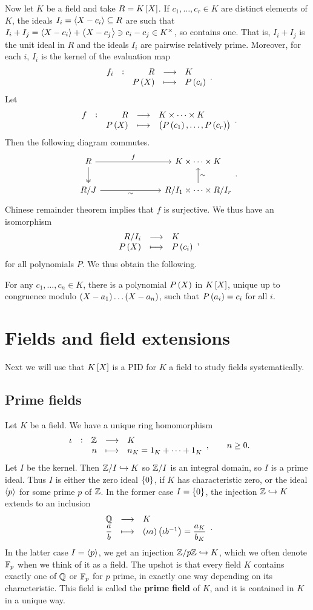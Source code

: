 Now let $ K $ be a field and take $ R = K\sbr{X} $. If $ c_1, \dots, c_r \in K $ are distinct elements of $ K $, the ideals $ I_i = \left\langle X - c_i \right\rangle \subseteq R $ are such that $ I_i + I_j = \left\langle X - c_i \right\rangle + \left\langle X - c_j \right\rangle \ni c_i - c_j \in K^\times $, so contains one. That is, $ I_i + I_j $ is the unit ideal in $ R $ and the ideals $ I_i $ are pairwise relatively prime. Moreover, for each $ i $, $ I_i $ is the kernel of the evaluation map
$$ \function[f_i]{R}{K}{P\br{X}}{P\br{c_i}}. $$
Let
$$ \function[f]{R}{K \times \dots \times K}{P\br{X}}{\br{P\br{c_1}, \dots, P\br{c_r}}}. $$
Then the following diagram commutes.
$$
\begin{tikzcd}[column sep=1in]
R \arrow{r}{f} \arrow[twoheadrightarrow]{d} & K \times \dots \times K \\
R / J \arrow[swap]{r}{\sim} & R / I_1 \times \dots \times R / I_r \arrow[swap]{u}{\sim}
\end{tikzcd}.
$$
Chinese remainder theorem implies that $ f $ is surjective. We thus have an isomorphism
$$ \function{R / I_i}{K}{P\br{X}}{P\br{c_i}}, $$
for all polynomials $ P $. We thus obtain the following.

\begin{theorem}
For any $ c_1, \dots, c_n \in K $, there is a polynomial $ P\br{X} $ in $ K\sbr{X} $, unique up to congruence modulo $ \br{X - a_1} \dots \br{X - a_n} $, such that $ P\br{a_i} = c_i $ for all $ i $.
\end{theorem}

\pagebreak

\section{Fields and field extensions}


Next we will use that $ K\sbr{X} $ is a PID for $ K $ a field to study fields systematically.

\subsection{Prime fields}

Let $ K $ be a field. We have a unique ring homomorphism
$$ \function[\iota]{\ZZ}{K}{n}{n_K = 1_K + \dots + 1_K}, \qquad n \ge 0. $$
Let $ I $ be the kernel. Then $ \mathbb{Z} / I \hookrightarrow K $ so $ \mathbb{Z} / I $ is an integral domain, so $ I $ is a prime ideal. Thus $ I $ is either the zero ideal $ \cbr{0} $, if $ K $ has characteristic zero, or the ideal $ \left\langle p \right\rangle $ for some prime $ p $ of $ \mathbb{Z} $. In the former case $ I = \cbr{0} $, the injection $ \mathbb{Z} \hookrightarrow K $ extends to an inclusion
$$ \function{\QQ}{K}{\dfrac{a}{b}}{\br{\iota a}\br{\iota b^{-1}} = \dfrac{a_K}{b_K}}. $$
In the latter case $ I = \left\langle p \right\rangle $, we get an injection $ \mathbb{Z} / p\mathbb{Z} \hookrightarrow K $, which we often denote $ \mathbb{F}_p $ when we think of it as a field. The upshot is that every field $ K $ contains exactly one of $ \mathbb{Q} $ or $ \mathbb{F}_p $ for $ p $ prime, in exactly one way depending on its characteristic. This field is called the \textbf{prime field} of $ K $, and it is contained in $ K $ in a unique way.

